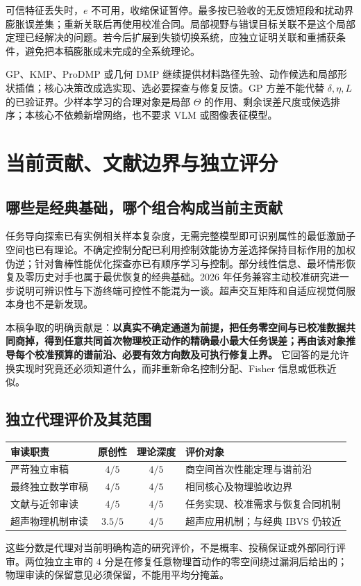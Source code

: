 \documentclass[11pt,a4paper]{article}
\numberwithin{equation}{section}
\theoremstyle{definition}
\begin{document}
可信特征丢失时，$e$ 不可用，收缩保证暂停。最多按已验收的无反馈短段和扰动界膨胀误差集；重新关联后再使用校准合同。局部视野与错误目标关联不是这个局部定理已经解决的问题。若今后扩展到失锁切换系统，应独立证明关联和重捕获条件，避免把本稿膨胀成未完成的全系统理论。

GP、KMP、ProDMP 或几何 DMP 继续提供材料路径先验、动作候选和局部形状插值；核心决策改成选实现、选必要探查与修复反馈。GP 方差不能代替 $\delta,\eta,L$ 的已验证界。少样本学习的合理对象是局部 $\Theta$ 的作用、剩余误差尺度或候选排序；本核心不依赖新增网络，也不要求 VLM 或图像表征模型。

\section{当前贡献、文献边界与独立评分}
\subsection{哪些是经典基础，哪个组合构成当前主贡献}
任务导向探索已有实例相关样本复杂度\cite{wagenmaker2021}，无需完整模型即可识别属性的最低激励子空间也已有理论\cite{kang2023}。不确定控制分配已利用控制效能协方差选择保持目标作用的加权伪逆\cite{grauer2022}；针对鲁棒性能优化探查亦已有顺序学习与控制\cite{venkata2024}。部分线性信息、最坏情形恢复及零历史对手也属于最优恢复的经典基础\cite{foucart2024}。2026 年任务兼容主动校准研究进一步说明可辨识性与下游终端可控性不能混为一谈\cite{kobayashi2026}。超声交互矩阵和自适应视觉伺服本身也不是新发现\cite{krupa2005}。

本稿争取的明确贡献是：\textbf{以真实不确定通道为前提，把任务零空间与已校准数据共同商掉，得到任意共同首次物理校正动作的精确最小最大任务误差；再由该对象推导每个校准预算的谱前沿、必要有效方向数及可执行修复上界。} 它回答的是允许换实现时究竟还必须知道什么，而非重新命名控制分配、Fisher 信息或低秩近似。

\subsection{独立代理评价及其范围}
\begin{center}
\begin{tabularx}{\linewidth}{YccY}
\toprule
审读职责 & 原创性 & 理论深度 & 评价对象\\
\midrule
严苛独立审稿 & $4/5$ & $4/5$ & 商空间首次性能定理与谱前沿\\
最终独立数学审稿 & $4/5$ & $4/5$ & 相同核心及物理验收边界\\
文献与近邻审读 & $4/5$ & $4/5$ & 任务实现、校准需求与恢复合同机制\\
超声物理机制审读 & $3.5/5$ & $4/5$ & 超声应用机制；与经典 IBVS 仍较近\\
\bottomrule
\end{tabularx}
\end{center}
这些分数是代理对当前明确构造的研究评价，不是概率、投稿保证或外部同行评审。两位独立主审的 $4$ 分是在修复任意物理首动作的零空间绕过漏洞后给出的；物理审读的保留意见必须保留，不能用平均分掩盖。
\end{document}
